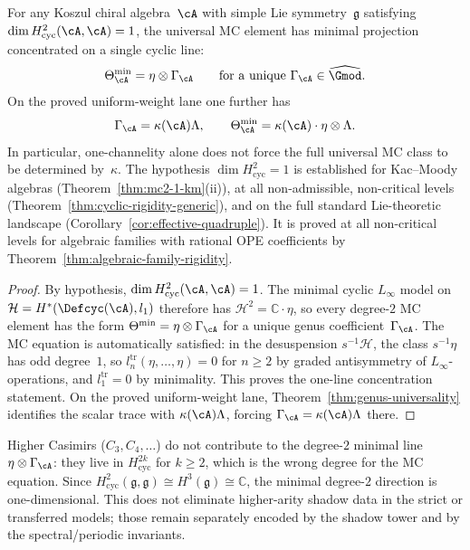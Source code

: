 \begin{corollary}
\label{cor:scalar-saturation}
For any Koszul chiral algebra~$\cA$ with simple Lie
symmetry~$\mathfrak{g}$ satisfying
$\dim H^2_{\mathrm{cyc}}(\cA,\cA) = 1$, the universal MC element
has minimal projection concentrated on a single cyclic line:
\[
\Theta_{\cA}^{\min} = \eta \otimes \Gamma_{\cA}
\qquad
\text{for a unique }\Gamma_{\cA}\in\widehat{\Gmod}.
\]
On the proved uniform-weight lane one further has
\[
\Gamma_{\cA} = \kappa(\cA)\Lambda,
\qquad
\Theta_{\cA}^{\min}
= \kappa(\cA) \cdot \eta \otimes \Lambda.
\]
In particular, one-channelity alone does not force the full
universal MC class to be determined by~$\kappa$.
The hypothesis $\dim H^2_{\mathrm{cyc}} = 1$ is established
for Kac--Moody algebras
\textup{(}Theorem~\textup{\ref{thm:mc2-1-km}}\textup{(ii)}\textup{)},
at all non-admissible, non-critical levels
\textup{(}Theorem~\textup{\ref{thm:cyclic-rigidity-generic}}\textup{)},
and on the full standard Lie-theoretic landscape
\textup{(}Corollary~\textup{\ref{cor:effective-quadruple}}\textup{)}.
It is proved at all non-critical levels for
algebraic families with rational OPE coefficients by
Theorem~\textup{\ref{thm:algebraic-family-rigidity}}.
\end{corollary}

\begin{proof}
By hypothesis, $\dim H^2_{\mathrm{cyc}}(\cA,\cA) = 1$.
The minimal cyclic $L_\infty$ model on
$\mathcal{H} = H^*(\Defcyc(\cA), l_1)$ therefore has
$\mathcal{H}^2 = \mathbb{C}\!\cdot\!\eta$, so every degree-$2$
MC element has the form
$\Theta^{\min} = \eta \otimes \Gamma_{\cA}$ for a unique
genus coefficient~$\Gamma_{\cA}$.
The MC equation is automatically satisfied: in the desuspension
$s^{-1}\mathcal{H}$, the class $s^{-1}\eta$ has odd degree~$1$,
so $l_n^{\mathrm{tr}}(\eta,\ldots,\eta) = 0$ for $n \geq 2$ by
graded antisymmetry of $L_\infty$-operations, and
$l_1^{\mathrm{tr}} = 0$ by minimality.
This proves the one-line concentration statement.
On the proved uniform-weight lane,
Theorem~\ref{thm:genus-universality} identifies the scalar trace
with $\kappa(\cA)\Lambda$, forcing
$\Gamma_{\cA} = \kappa(\cA)\Lambda$ there.
\end{proof}

\begin{remark}
\label{rem:scalar-saturation-casimirs}
Higher Casimirs ($C_3, C_4, \ldots$) do not contribute to
the degree-$2$ minimal line $\eta\otimes\Gamma_{\cA}$:
they live in $H^{2k}_{\mathrm{cyc}}$ for
$k\geq 2$, which is the wrong degree for the MC equation.
Since $H^2_{\mathrm{cyc}}(\mathfrak{g},\mathfrak{g})\cong
H^3(\mathfrak{g})\cong\mathbb{C}$, the minimal degree-$2$
direction is one-dimensional.
This does not eliminate higher-arity shadow data in the strict
or transferred models; those remain separately encoded by the
shadow tower and by the spectral/periodic invariants.
\end{remark}

